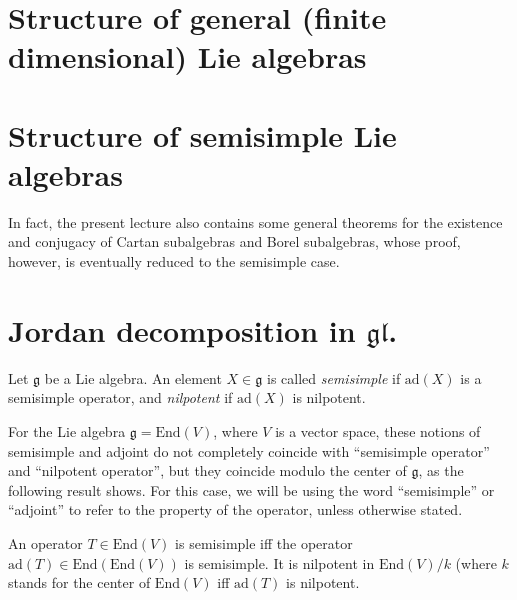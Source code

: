 
\section{Structure of general (finite dimensional) Lie algebras}



\section{Structure of semisimple Lie algebras}

In fact, the present lecture also contains some general theorems for the existence and conjugacy of Cartan subalgebras and Borel subalgebras, whose proof, however, is eventually reduced to the semisimple case.

\section{Jordan decomposition in $\mathfrak{gl}$.}

\begin{definition}
 Let $\mathfrak g$ be a Lie algebra. An element $X\in \mathfrak g$ is called \emph{semisimple} if $\text{ad}(X)$ is a semisimple operator, and \emph{nilpotent} if $\text{ad}(X)$ is nilpotent.
\end{definition}

\begin{remark}
 For the Lie algebra $\mathfrak g = \text{End}(V)$, where $V$ is a vector space, these notions of semisimple and adjoint do not completely coincide with ``semisimple operator'' and ``nilpotent operator'', but they coincide modulo the center of $\mathfrak g$, as the following result shows. For this case, we will be using the word ``semisimple'' or ``adjoint'' to refer to the property of the operator, unless otherwise stated.
\end{remark}

\begin{proposition}
 An operator $T\in \text{End}(V)$ is semisimple iff the operator $\text{ad}(T)\in \text{End}(\text{End}(V))$ is semisimple. It is nilpotent in $\text{End}(V)/k$ (where $k$ stands for the center of $\text{End}(V)$ iff $\text{ad}(T)$ is nilpotent.
\end{proposition}


